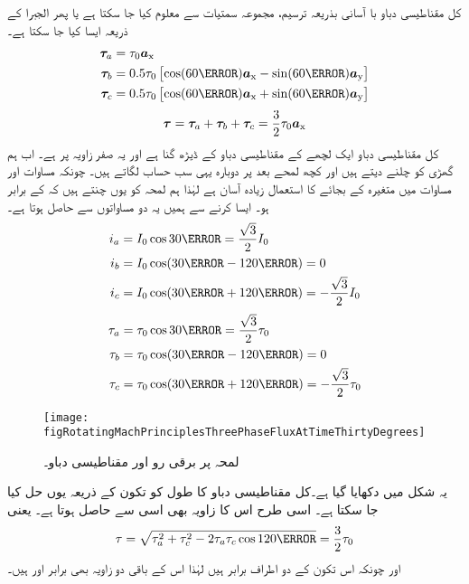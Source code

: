 کل مقناطیسی دباو با آسانی بذریعہ ترسیم،  مجموعہ سمتیات سے  معلوم کیا جا سکتا ہے یا پھر الجبرا کے ذریعہ ایسا کیا جا سکتا ہے۔
\begin{gather}
\begin{aligned}
\kvec{\tau}_a&=\tau_0 \ax\\
\kvec{\tau}_b&=0.5 \tau_0 \left[\cos (60\degree) \ax-\sin (60\degree)\ay \right]\\
\kvec{\tau}_c&=0.5 \tau_0 \left[\cos (60\degree) \ax+\sin (60\degree)\ay \right]
\end{aligned}
\end{gather}
%
\begin{align}
{\ensuremath{{\boldsymbol{\tau}}}}={{\boldsymbol{\tau}}}_a+{{\boldsymbol{\tau}}}_b+{{\boldsymbol{\tau}}}_c=\frac{3}{2} \tau_0 {\boldsymbol{a}}_{\textup{x}}
\end{align}
کل مقناطیسی دباو ایک لچھے کے مقناطیسی دباو کے ڈیڑھ گنا ہے اور یہ صفر زاویہ پر ہے۔ اب ہم گھڑی کو چلنے دیتے ہیں اور کچھ لمحے بعد  پر دوبارہ یہی سب حساب لگاتے ہیں۔ چونکہ مساوات   اور مساوات   میں متغیرہ  کے بجائے  کا استعمال زیادہ آسان ہے لہٰذا ہم لمحہ  کو یوں چنتے ہیں کہ   کے برابر ہو۔ ایسا کرنے سے ہمیں یہ دو مساواتوں سے حاصل ہوتا ہے۔
\begin{gather}
\begin{aligned}
i_a&=I_0 \cos 30\degree=\frac{\sqrt{3}}{2} I_0\\
i_b&=I_0 \cos (30\degree-120\degree)=0\\
i_c&=I_0 \cos (30\degree+120\degree)=-\frac{\sqrt{3}}{2} I_0
\end{aligned}
\end{gather}
%
\begin{gather}
\begin{aligned}
\tau_a&=\tau_0 \cos 30\degree=\frac{\sqrt{3}}{2} \tau_0\\
\tau_b&=\tau_0 \cos (30\degree-120\degree)=0\\
\tau_c&=\tau_0 \cos (30\degree+120\degree)=-\frac{\sqrt{3}}{2} \tau_0
\end{aligned}
\end{gather}
%
\begin{figure}
\centering
\texttt{[image: figRotatingMachPrinciplesThreePhaseFluxAtTimeThirtyDegrees]}
\caption{ لمحہ  پر برقی رو اور مقناطیسی دباو۔}
\label{شکل_گھموتے_مشین_وقت_تیس_پر_دباو}
\end{figure}
یہ شکل   میں دکھایا گیا ہے۔کل مقناطیسی دباو کا طول  کو تکون کے ذریعہ یوں حل کیا جا سکتا ہے۔ اسی طرح اس کا زاویہ بھی اسی سے حاصل ہوتا ہے۔ یعنی
\begin{align}
\tau=\sqrt{\tau_a^2+\tau_c^2-2 \tau_a \tau_c \cos 120\degree}=\frac{3}{2}\tau_0
\end{align}
اور چونکہ اس تکون کے دو اطراف برابر ہیں لہٰذا اس کے باقی دو زاویہ بھی برابر اور  ہیں۔

